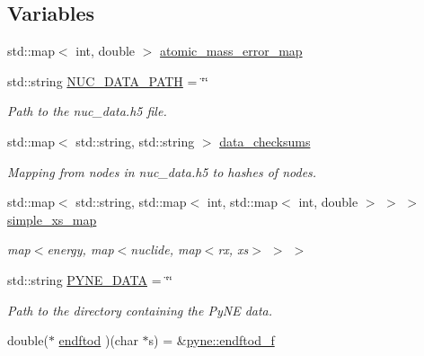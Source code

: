 \subsection*{Variables}
\begin{DoxyCompactItemize}
\item 
std\+::map$<$ int, double $>$ \hyperlink{namespacepyne_a70711189f1078e2ebc132db9ce7ab0a7}{atomic\+\_\+mass\+\_\+error\+\_\+map}
\item 
std\+::string \hyperlink{namespacepyne_ac4b3b3dcf295d033b906bf921d820ae2}{N\+U\+C\+\_\+\+D\+A\+T\+A\+\_\+\+P\+A\+TH} = \char`\"{}\char`\"{}\hypertarget{namespacepyne_ac4b3b3dcf295d033b906bf921d820ae2}{}\label{namespacepyne_ac4b3b3dcf295d033b906bf921d820ae2}

\begin{DoxyCompactList}\small\item\em Path to the nuc\+\_\+data.\+h5 file. \end{DoxyCompactList}\item 
std\+::map$<$ std\+::string, std\+::string $>$ \hyperlink{namespacepyne_a092bde815498a51a7532e3021a63ede5}{data\+\_\+checksums}
\begin{DoxyCompactList}\small\item\em Mapping from nodes in nuc\+\_\+data.\+h5 to hashes of nodes. \end{DoxyCompactList}\item 
std\+::map$<$ std\+::string, std\+::map$<$ int, std\+::map$<$ int, double $>$ $>$ $>$ \hyperlink{namespacepyne_a75b3d385906d5d2f078a6d099629a5c8}{simple\+\_\+xs\+\_\+map}\hypertarget{namespacepyne_a75b3d385906d5d2f078a6d099629a5c8}{}\label{namespacepyne_a75b3d385906d5d2f078a6d099629a5c8}

\begin{DoxyCompactList}\small\item\em map$<$energy, map$<$nuclide, map$<$rx, xs$>$ $>$ $>$ \end{DoxyCompactList}\item 
std\+::string \hyperlink{namespacepyne_a7927bda45ba222dccef6e43a373b76a6}{P\+Y\+N\+E\+\_\+\+D\+A\+TA} = \char`\"{}\char`\"{}\hypertarget{namespacepyne_a7927bda45ba222dccef6e43a373b76a6}{}\label{namespacepyne_a7927bda45ba222dccef6e43a373b76a6}

\begin{DoxyCompactList}\small\item\em Path to the directory containing the Py\+NE data. \end{DoxyCompactList}\item 
double($\ast$ \hyperlink{namespacepyne_aa938a7defc049d691fa6d84aa2c1931e}{endftod} )(char $\ast$s) = \&\hyperlink{namespacepyne_a14e300f1e589b42aaa451bc3cf4c70b8}{pyne\+::endftod\+\_\+f}\hypertarget{namespacepyne_aa938a7defc049d691fa6d84aa2c1931e}{}\label{namespacepyne_aa938a7defc049d691fa6d84aa2c1931e}


\end{DoxyCompactItemize}
